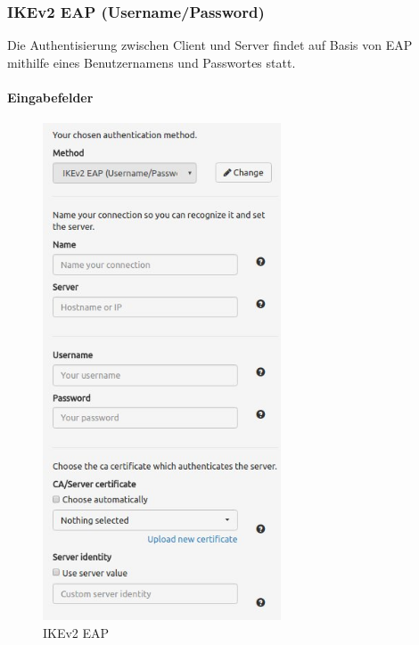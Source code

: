 \subsubsection{IKEv2 EAP (Username/Password)}
Die Authentisierung zwischen Client und Server findet auf Basis von EAP mithilfe eines Benutzernamens und Passwortes statt.

\noindent\begin{minipage}[t]{0.5\textwidth}
\vspace{0pt}
\paragraph{Eingabefelder}\mbox{}\medskip
    \begin{figure}[H]
    	\centering
    	\includegraphics[width=200pt]{images/forms/eap_form.jpg}
    	\caption{IKEv2 EAP}
    \end{figure}
\end{minipage}
\hfill
